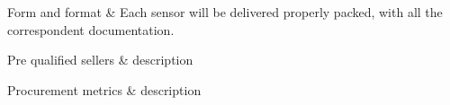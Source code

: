 \begin{table}[H]
\begin{tabular}
		Form and format & Each sensor will be delivered properly packed, with all the correspondent documentation.\\
		\hline
		
		Pre qualified sellers & description\\
		\hline
		
		Procurement metrics & description\\
		
		\bottomrule[2pt]		
		
	\end{tabular}
	\caption{SOW 5.1.1: Manufacturing of payload sensors}
\end{table}


